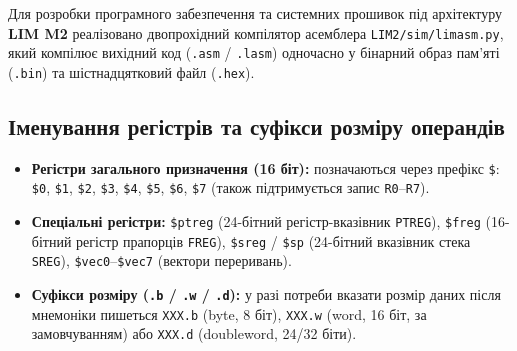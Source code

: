 \documentclass[11pt,a4paper]{article}
\newcommand{\reg}[1]{\texttt{#1}}
\begin{document}
Для розробки програмного забезпечення та системних прошивок під архітектуру \textbf{LIM M2} реалізовано двопрохідний компілятор асемблера \texttt{LIM2/sim/limasm.py}, який компілює вихідний код (\texttt{.asm} / \texttt{.lasm}) одночасно у бінарний образ пам'яті (\texttt{.bin}) та шістнадцятковий файл (\texttt{.hex}).

\subsection{Іменування регістрів та суфікси розміру операндів}
\begin{itemize}
  \item \textbf{Регістри загального призначення (16 біт):} позначаються через префікс \texttt{\$}: \texttt{\$0}, \texttt{\$1}, \texttt{\$2}, \texttt{\$3}, \texttt{\$4}, \texttt{\$5}, \texttt{\$6}, \texttt{\$7} (також підтримується запис \texttt{R0}--\texttt{R7}).
  \item \textbf{Спеціальні регістри:} \texttt{\$ptreg} (24-бітний регістр-вказівник \reg{PTREG}), \texttt{\$freg} (16-бітний регістр прапорців \reg{FREG}), \texttt{\$sreg} / \texttt{\$sp} (24-бітний вказівник стека \reg{SREG}), \texttt{\$vec0}--\texttt{\$vec7} (вектори переривань).
  \item \textbf{Суфікси розміру (\texttt{.b} / \texttt{.w} / \texttt{.d}):} у разі потреби вказати розмір даних після мнемоніки пишеться \texttt{XXX.b} (byte, 8 біт), \texttt{XXX.w} (word, 16 біт, за замовчуванням) або \texttt{XXX.d} (doubleword, 24/32 біти).
\end{itemize}
\end{document}
